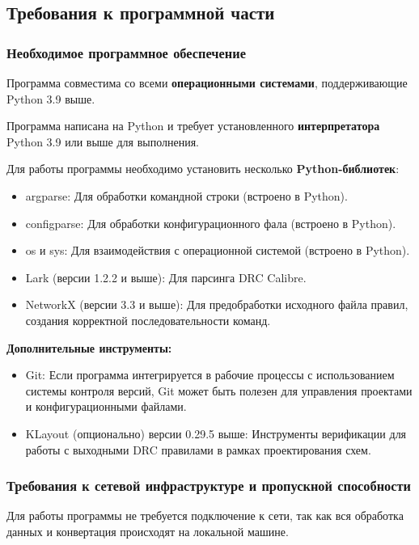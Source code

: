 \subsection{Требования к программной части}

\subsubsection{Необходимое программное обеспечение}

Программа совместима со всеми \textbf{операционными системами},
поддерживающие Python 3.9 выше.

Программа написана на Python
и требует установленного \textbf{интерпретатора} Python 3.9
или выше для выполнения.

Для работы программы необходимо установить
несколько \textbf{Python-библиотек}:
\begin{itemize}
	\item argparse:
		Для обработки командной строки (встроено в Python).
	\item configparse:
		Для обработки конфигурационного фала (встроено в Python).
	\item os и sys:
		Для взаимодействия с операционной системой (встроено в Python).
	\item Lark (версии 1.2.2 и выше):
		Для парсинга DRC Calibre.
	\item NetworkX (версии 3.3 и выше):
		Для предобработки исходного файла правил,
		создания корректной последовательности команд.
\end{itemize}

\textbf{Дополнительные инструменты:}

\begin{itemize}
	\item Git: Если программа интегрируется в рабочие процессы
		с использованием системы контроля версий,
		Git может быть полезен для управления проектами
		и конфигурационными файлами.
	\item KLayout (опционально) версии 0.29.5 выше:
		Инструменты верификации для работы
		с выходными DRC правилами в рамках проектирования схем.
\end{itemize}

\subsubsection{Требования к сетевой инфраструктуре и пропускной способности}

Для работы программы не требуется подключение к сети,
так как вся обработка данных и конвертация происходят на локальной машине.

